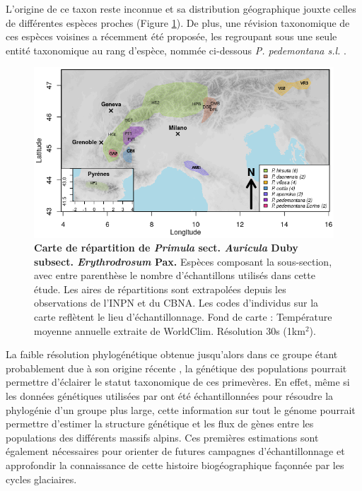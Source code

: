 L'origine de ce taxon reste inconnue et sa distribution géographique jouxte celles de différentes espèces proches (Figure \ref{carte}). De plus, une révision taxonomique de ces espèces voisines a récemment été proposée, les regroupant sous une seule entité taxonomique au rang d'espèce, nommée ci-dessous \textit{P. pedemontana s.l.} \citep{Boucher2016a}. 

\begin{figure}[!ht]
    \centering
    \includegraphics[width=1\textwidth]{fig/carte.png}
    \caption{\textbf{Carte de répartition de \textit{Primula} sect. \textit{Auricula} Duby subsect. \textit{Erythrodrosum} Pax.} Espèces composant la sous-section, avec entre parenthèse le nombre d'échantillons utilisés dans cette étude. Les aires de répartitions sont extrapolées depuis les observations de l'INPN et du CBNA. Les codes d'individus sur la carte reflètent le lieu d'échantillonnage. Fond de carte : Température moyenne annuelle extraite de WorldClim. Résolution 30s (1km$^{2}$).}
    \label{carte}
    \centering
\end{figure} 

La faible résolution phylogénétique obtenue jusqu'alors dans ce groupe étant probablement due à son origine récente \citep{Boucher2016} , la génétique des populations pourrait permettre d'éclairer le statut taxonomique de ces primevères. En effet, même si les données génétiques utilisées par \citet{Boucher2016a} ont été échantillonnées pour résoudre la phylogénie d'un groupe plus large, cette information sur tout le génome pourrait permettre d'estimer la structure génétique et les flux de gènes entre les populations des différents massifs alpins. Ces premières estimations sont également nécessaires pour orienter de futures campagnes d'échantillonnage et approfondir la connaissance de cette histoire biogéographique façonnée par les cycles glaciaires. 

